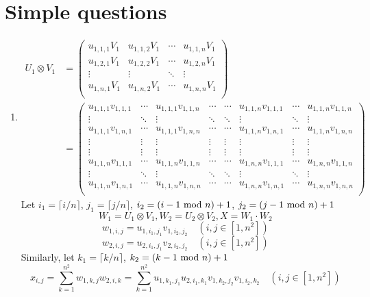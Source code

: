 \documentclass{article}
\renewcommand{\mod}{{\rm\ mod\ }}
\begin{document}
\section{Simple questions}
\begin{enumerate}
\item
\begin{align*}
U_1\otimes V_1&=
\begin{pmatrix}
u_{1,1,1}V_1 & u_{1,1,2}V_1 & \cdots & u_{1,1,n}V_1 \\
u_{1,2,1}V_1 & u_{1,2,2}V_1 & \cdots & u_{1,2,n}V_1 \\
\vdots & \vdots & \ddots & \vdots \\
u_{1,n,1}V_1 & u_{1,n,2}V_1 & \cdots & u_{1,n,n}V_1 \\
\end{pmatrix}
\\&=
\begin{pmatrix}
u_{1,1,1}v_{1,1,1} & \cdots & u_{1,1,1}v_{1,1,n} & \cdots & \cdots & u_{1,1,n}v_{1,1,1} & \cdots & u_{1,1,n}v_{1,1,n} \\
\vdots & \ddots & \vdots & \ddots & \ddots & \vdots & \ddots & \vdots \\
u_{1,1,1}v_{1,n,1} & \cdots & u_{1,1,1}v_{1,n,n} & \cdots & \cdots & u_{1,1,n}v_{1,n,1} & \cdots & u_{1,1,n}v_{1,n,n} \\
\vdots & \vdots & \vdots & \vdots & \vdots & \vdots & \vdots & \vdots \\
\vdots & \vdots & \vdots & \vdots & \vdots & \vdots & \vdots & \vdots \\
u_{1,1,n}v_{1,1,1} & \cdots & u_{1,1,n}v_{1,1,n} & \cdots & \cdots & u_{1,n,n}v_{1,1,1} & \cdots & u_{1,n,n}v_{1,1,n} \\
\vdots & \ddots & \vdots & \ddots & \ddots & \vdots & \ddots & \vdots \\
u_{1,1,n}v_{1,n,1} & \cdots & u_{1,1,n}v_{1,n,n} & \cdots & \cdots & u_{1,n,n}v_{1,n,1} & \cdots & u_{1,n,n}v_{1,n,n} \\
\end{pmatrix}
\end{align*}
Let $i_1=\lceil i/n \rceil$, $j_1=\lceil j/n \rceil$, $i_2=(i-1\mod n)+1$, $j_2=(j-1\mod n)+1$
$$W_1=U_1\otimes V_1,W_2=U_2\otimes V_2,X=W_1\cdot W_2$$
$$w_{1,i,j}= u_{1,i_1,j_1}v_{1,i_2,j_2} \quad (i,j\in[1,n^2])$$
$$w_{2,i,j}= u_{2,i_1,j_1}v_{2,i_2,j_2} \quad (i,j\in[1,n^2])$$
Similarly, let $k_1=\lceil k/n \rceil$, $k_2=(k-1\mod n)+1$
$$x_{i,j}=\sum_{k=1}^{n^2}w_{1,k,j}w_{2,i,k}=\sum_{k=1}^{n^2}u_{1,k_1,j_1}u_{2,i_1,k_1}v_{1,k_2,j_2}v_{1,i_2,k_2} \quad (i,j\in[1,n^2])$$


\end{enumerate}
\end{document}
